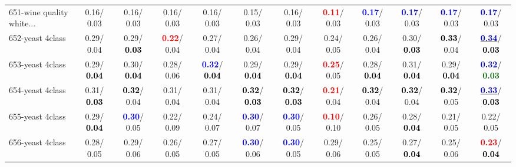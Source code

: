 \begin{table}[h]
\begin{center}
{\begin{tabular}{lc|c|c|c|c|c|c|c|c|c|c}
651-wine quality white... &   0.16/  0.03 &   0.16/  0.03 &   0.16/  0.03 &   0.16/  0.03 &   0.15/  0.03 &   0.16/  0.03 & \textcolor{red}{\textbf{  0.11}}/  0.03 & \textcolor{blue}{\textbf{  0.17}}/  0.03 & \textcolor{blue}{\textbf{  0.17}}/  0.03 & \textcolor{blue}{\textbf{  0.17}}/  0.03 & \textcolor{blue}{\textbf{  0.17}}/  0.03 \\
652-yeast 4class &   0.29/  0.04 &   0.29/\textcolor{black}{\textbf{  0.03}} & \textcolor{red}{\textbf{  0.22}}/  0.04 &   0.27/  0.04 &   0.26/  0.04 &   0.29/  0.04 &   0.24/  0.05 &   0.26/  0.04 &   0.30/\textcolor{black}{\textbf{  0.03}} & \textcolor{black}{\textbf{  0.33}}/  0.04 & \underline{\textcolor{blue}{\textbf{  0.34}}}/\textcolor{black}{\textbf{  0.03}} \\
653-yeast 4class &   0.29/\textcolor{black}{\textbf{  0.04}} &   0.30/\textcolor{black}{\textbf{  0.04}} &   0.28/  0.06 & \textcolor{blue}{\textbf{  0.32}}/\textcolor{black}{\textbf{  0.04}} &   0.29/\textcolor{black}{\textbf{  0.04}} &   0.29/\textcolor{black}{\textbf{  0.04}} & \textcolor{red}{\textbf{  0.25}}/  0.05 &   0.28/\textcolor{black}{\textbf{  0.04}} &   0.31/\textcolor{black}{\textbf{  0.04}} &   0.29/\textcolor{black}{\textbf{  0.04}} & \textcolor{blue}{\textbf{  0.32}}/\textcolor{darkgreen}{\textbf{  0.03}} \\
654-yeast 4class &   0.31/\textcolor{black}{\textbf{  0.03}} & \textcolor{black}{\textbf{  0.32}}/  0.04 &   0.31/  0.04 &   0.31/  0.04 & \textcolor{black}{\textbf{  0.32}}/\textcolor{black}{\textbf{  0.03}} & \textcolor{black}{\textbf{  0.32}}/\textcolor{black}{\textbf{  0.03}} & \textcolor{red}{\textbf{  0.21}}/  0.04 & \textcolor{black}{\textbf{  0.32}}/  0.04 & \textcolor{black}{\textbf{  0.32}}/  0.04 & \textcolor{black}{\textbf{  0.32}}/  0.05 & \underline{\textcolor{blue}{\textbf{  0.33}}}/\textcolor{black}{\textbf{  0.03}} \\ \hline
655-yeast 4class &   0.29/\textcolor{black}{\textbf{  0.04}} & \textcolor{blue}{\textbf{  0.30}}/  0.05 &   0.22/  0.09 &   0.24/  0.07 & \textcolor{blue}{\textbf{  0.30}}/  0.07 & \textcolor{blue}{\textbf{  0.30}}/  0.05 & \textcolor{red}{\textbf{  0.10}}/  0.10 &   0.26/  0.05 &   0.28/\textcolor{black}{\textbf{  0.04}} &   0.21/  0.05 &   0.22/  0.05 \\
656-yeast 4class &   0.28/  0.05 &   0.29/  0.06 &   0.26/  0.05 &   0.27/  0.05 & \textcolor{blue}{\textbf{  0.30}}/  0.06 & \textcolor{blue}{\textbf{  0.30}}/  0.05 &   0.29/  0.06 &   0.25/  0.05 &   0.27/\textcolor{black}{\textbf{  0.04}} &   0.25/  0.06 & \textcolor{red}{\textbf{  0.23}}/\textcolor{black}{\textbf{  0.04}} \\

\end{tabular}}
\end{center}
\end{table}
